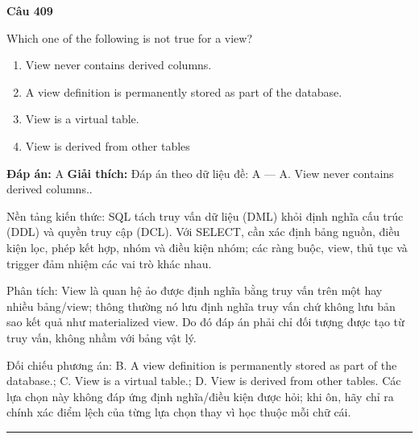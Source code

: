 \documentclass[11pt,a4paper]{article}
\newenvironment{question}[1]{%
  \par\vspace{1em}\noindent\textbf{\large Câu #1}\par\vspace{0.4em}
}{%
  \par\vspace{1em}\hrule\vspace{0.6em}
}
\newenvironment{choices}{%
  \begin{enumerate}[label=\textbf{\Alph*.},leftmargin=2.2em,itemsep=2pt,topsep=3pt]
}{%
  \end{enumerate}
}
\newcommand{\choice}{\item}
\begin{document}
\begin{question}{409}
Which one of the following is not true for a view?
\begin{choices}
\choice View never contains derived columns.
\choice A view definition is permanently stored as part of the database.
\choice View is a virtual table.
\choice View is derived from other tables
\end{choices}
\textbf{Đáp án:} A
\textbf{Giải thích:} Đáp án theo dữ liệu đề: A — A. View never contains derived columns..

Nền tảng kiến thức: SQL tách truy vấn dữ liệu (DML) khỏi định nghĩa cấu trúc (DDL) và quyền truy cập (DCL). Với SELECT, cần xác định bảng nguồn, điều kiện lọc, phép kết hợp, nhóm và điều kiện nhóm; các ràng buộc, view, thủ tục và trigger đảm nhiệm các vai trò khác nhau.

Phân tích: View là quan hệ ảo được định nghĩa bằng truy vấn trên một hay nhiều bảng/view; thông thường nó lưu định nghĩa truy vấn chứ không lưu bản sao kết quả như materialized view. Do đó đáp án phải chỉ đối tượng được tạo từ truy vấn, không nhầm với bảng vật lý.

Đối chiếu phương án: B. A view definition is permanently stored as part of the database.; C. View is a virtual table.; D. View is derived from other tables. Các lựa chọn này không đáp ứng định nghĩa/điều kiện được hỏi; khi ôn, hãy chỉ ra chính xác điểm lệch của từng lựa chọn thay vì học thuộc mỗi chữ cái.
\end{question}
\end{document}
